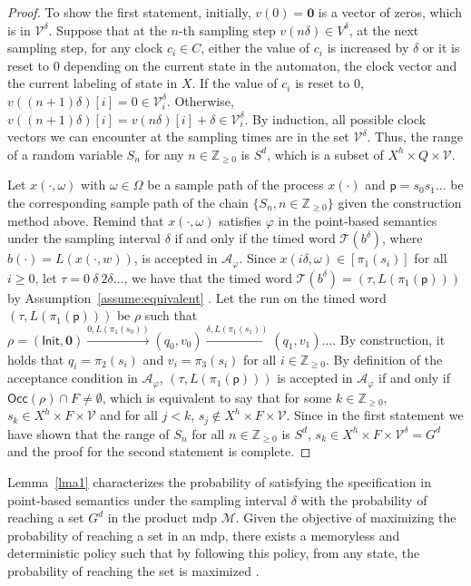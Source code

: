 \documentclass[letterpaper, 10 pt, conference]{ieeeconf}
\newcommand{\calA}{\mathcal{A}}
\newcommand{\calT}{\mathcal{T}}
\newcommand{\bbZ}{\mathbb{Z}_{\ge 0}}
\newcommand{\Occ}{\mathsf{Occ}}
\newcommand{\calV}{\mathcal{V}}
\newcommand{\calM}{\mathcal{M}}
\newcommand{\init}{\mathsf{Init}}
\begin{document}
\begin{proof}
  To show the first
  statement, initially, $v(0)=\bm 0 $ is a vector of zeros, which is in
  $\calV^\delta$. Suppose that at the $n$-th sampling step
  $v(n\delta) \in V^\delta$, at the next sampling step, for any clock
  $c_i \in C$, either the value of $c_i$ is increased by $\delta$ or
  it is reset to $0$ depending on the current state in the automaton,
  the clock vector and the current labeling of state in $X$.  If the
  value of $c_i$ is reset to $0$,
  $v((n+1)\delta)[i]=0 \in \calV_i^\delta$. Otherwise,
  $v((n+1)\delta)[i]=v(n\delta)[i]+\delta \in \calV_i^\delta $.  By
  induction, all possible clock vectors we can encounter at the
  sampling times are in the set $\calV^\delta$. Thus, the range of a
  random variable $S_n$ for any $n \in \bbZ$ is $S^d$, which is a
  subset of $X^h\times Q\times \calV$.


  Let $x(\cdot,\omega)$ with $\omega \in \Omega$ be a sample path of
  the process $x(\cdot)$ and $\mathsf{p}= s_0s_1\ldots $ be the
  corresponding sample path of the chain $\{S_n, n \in \bbZ\}$ given
  the construction method above. Remind that $x(\cdot,\omega)$
  satisfies $\varphi$ in the point-based semantics under the sampling
  interval $\delta$ if and only if the timed word $\calT(b^\delta) $,
  where $b(\cdot) = L(x(\cdot, w))$, is accepted in $\calA_\varphi$.
  Since $x(i\delta,\omega) \in [\pi_1(s_i)] $ for all $ i \ge 0$, let
  $\tau = 0\ \delta\ 2\delta \ldots$, we have that the timed word
  $\calT(b^\delta) = (\tau, L(\pi_1(\mathsf{p})))$ by
  Assumption~\ref{assume:equivalent} . Let the run on the timed word
  $(\tau, L(\pi_1(\mathsf{p})))$ be $\rho $ such that
  $\rho= (\init, \bm 0)\xrightarrow{0, L(\pi_1(s_0))}(q_0,
  v_0)\xrightarrow{\delta, L(\pi_1(s_1))}(q_1,v_1)\ldots$.
  By construction, it holds that $q_i = \pi_2(s_i)$ and
  $v_i = \pi_3(s_i)$ for all $i \in \bbZ$. By definition of the
  acceptance condition in $\calA_\varphi$,
  $(\tau, L(\pi_1(\mathsf{p})))$ is accepted in $\calA_\varphi$ if and
  only if $\Occ(\rho)\cap F \ne \emptyset$, which is equivalent to say
  that for some $k \in \bbZ$, $s_k \in X^h\times F\times \calV$ and
  for all $j<k$, $s_j \notin X^h\times F\times \calV$. Since in the
  first statement we have shown that the range of $S_n$ for all
  $n \in \bbZ$ is $S^d$,
  $s_k \in X^h\times F\times \calV^\delta = G^d$ and the proof for the
  second statement is complete.
\end{proof}


Lemma~\ref{lma1} characterizes the probability of satisfying the
specification in point-based semantics under the sampling interval
$\delta$ with the probability of reaching a set $G^d$ in the product
\ac{mdp} $\calM$. Given the objective of maximizing the probability of
reaching a set in an \ac{mdp}, there exists a memoryless
and deterministic policy such that by following this policy, from any
state, the probability of reaching the set is maximized
\cite{Baier2008}.
\end{document}
